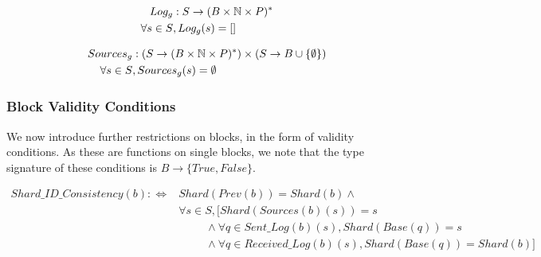 
\begin{defn}
\begin{align*}
  Log_g&: S \to (B \times \mathbb{N} \times P)^* \\
  \forall s \in S&, Log_g(s) = []
\end{align*}
\end{defn}

\begin{defn}
\begin{align*}
  Sources_g&: (S \to (B \times \mathbb{N} \times P)^*) \times (S \to B \cup \{\emptyset\}) \\
  \forall s \in S&, Sources_g(s) = \emptyset
\end{align*}
\end{defn}

\subsubsection{Block Validity Conditions}

We now introduce further restrictions on blocks, in the form of validity conditions. As these are functions on single blocks, we note that the type signature of these conditions is $B \to \{True, False\}$.

\begin{defn}
\begin{align*}
  Shard\_ID\_Consistency(b) :\Leftrightarrow& Shard(Prev(b)) = Shard(b) \land \\
  & \forall s \in S, \big[Shard(Sources(b)(s)) = s \\
  &~~~~~~~~~~~ \land \forall q \in Sent\_Log(b)(s), Shard(Base(q)) = s \\
  &~~~~~~~~~~~ \land \forall q \in Received\_Log(b)(s), Shard(Base(q)) = Shard(b) \big]
\end{align*}
\end{defn}

